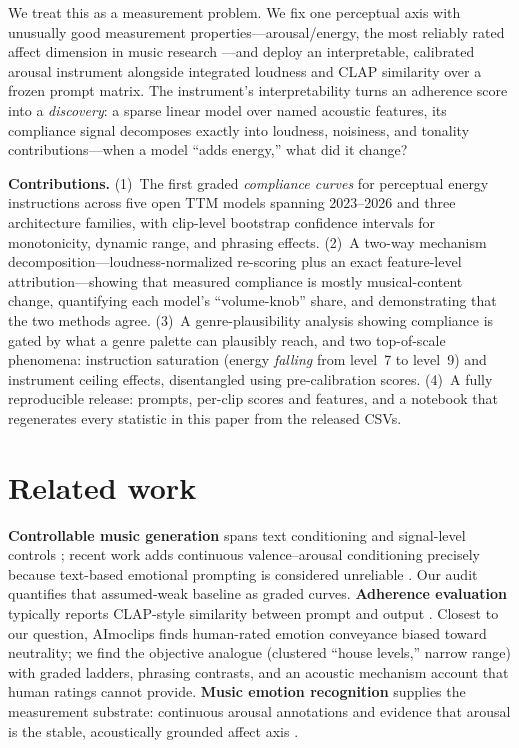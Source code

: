 \documentclass{article}
\begin{document}
We treat this as a measurement problem. We fix one perceptual axis with
unusually good measurement properties---arousal/energy, the most reliably rated
affect dimension in music research \citep{russell1980circumplex,
eerola2011comparison}---and deploy an interpretable, calibrated arousal
instrument \citep{p0aanon} alongside integrated loudness \citep{itu2015bs1770}
and CLAP similarity \citep{wu2023laionclap} over a frozen prompt matrix. The
instrument's interpretability turns an adherence score into a
\emph{discovery}: a sparse linear model over named acoustic features, its
compliance signal decomposes exactly into loudness, noisiness, and tonality
contributions---when a model ``adds energy,'' what did it change?

\textbf{Contributions.}
(1)~The first graded \emph{compliance curves} for perceptual energy
instructions across five open TTM models spanning 2023--2026 and three
architecture families, with clip-level bootstrap confidence intervals for
monotonicity, dynamic range, and phrasing effects.
(2)~A two-way mechanism decomposition---loudness-normalized re-scoring plus an
exact feature-level attribution---showing that measured compliance is mostly
musical-content change, quantifying each model's ``volume-knob'' share, and
demonstrating that the two methods agree.
(3)~A genre-plausibility analysis showing compliance is gated by what a genre
palette can plausibly reach, and two top-of-scale phenomena: instruction
saturation (energy \emph{falling} from level~7 to level~9) and instrument
ceiling effects, disentangled using pre-calibration scores.
(4)~A fully reproducible release: prompts, per-clip scores and features, and a
notebook that regenerates every statistic in this paper from the released CSVs.

\section{Related work}
\label{sec:related}

\textbf{Controllable music generation} spans text conditioning
\citep{copet2023musicgen, evans2025sao, gong2026acestep} and signal-level
controls \citep{musicongen2024}; recent work adds continuous valence--arousal
conditioning precisely because text-based emotional prompting is considered
unreliable \citep{laragen2025}. Our audit quantifies that assumed-weak
baseline as graded curves.
\textbf{Adherence evaluation} typically reports CLAP-style similarity between
prompt and output \citep{evalsurvey2025}. Closest to our question, AImoclips
\citep{go2025aimoclips} finds human-rated emotion conveyance biased toward
neutrality; we find the objective analogue (clustered ``house levels,''
narrow range) with graded ladders, phrasing contrasts, and an acoustic
mechanism account that human ratings cannot provide. \textbf{Music emotion recognition} supplies the measurement
substrate: continuous arousal annotations \citep{aljanaki2017deam,
zhang2018pmemo} and evidence that arousal is the stable, acoustically
grounded affect axis \citep{eerola2011comparison}.
\end{document}
